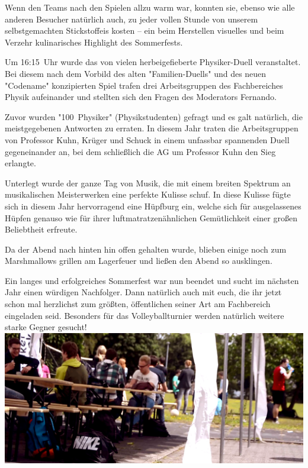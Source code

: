 \begin{multicols*}{2}
Wenn den Teams nach den Spielen allzu warm war, konnten sie, ebenso wie alle anderen Besucher natürlich auch, zu jeder vollen Stunde von unserem selbstgemachten Stickstoffeis kosten -- ein beim Herstellen visuelles und beim Verzehr kulinarisches Highlight des Sommerfests. 

Um 16:15~Uhr wurde das von vielen herbeigefieberte Physiker-Duell veranstaltet.
Bei diesem nach dem Vorbild des alten "Familien-Duells" und des neuen "Codename" konzipierten Spiel trafen drei Arbeitsgruppen des Fachbereiches Physik aufeinander und stellten sich den Fragen des Moderators Fernando.

Zuvor wurden "100~Physiker" (Physikstudenten) gefragt und es galt natürlich, die meistgegebenen Antworten zu erraten.
In diesem Jahr traten die Arbeitsgruppen von Professor Kuhn, Krüger und Schuck in einem unfassbar spannenden Duell gegeneinander an, bei dem schließlich die AG um Professor Kuhn den Sieg erlangte.

Unterlegt wurde der ganze Tag von Musik, die mit einem breiten Spektrum an musikalischen Meisterwerken eine perfekte Kulisse schuf. In diese Kulisse fügte sich in diesem Jahr hervorragend eine Hüpfburg ein, welche sich für ausgelassenes Hüpfen genauso wie für ihrer luftmatratzenähnlichen Gemütlichkeit einer großen Beliebtheit erfreute.

Da der Abend nach hinten hin offen gehalten wurde, blieben einige noch zum Marshmallows grillen am Lagerfeuer und ließen
den Abend so ausklingen.

Ein langes und erfolgreiches Sommerfest war nun beendet und sucht im nächsten Jahr einen würdigen Nachfolger.
Dann natürlich auch mit euch, die ihr jetzt schon mal herzlichst zum größten, öffentlichen seiner Art am Fachbereich eingeladen seid.
Besonders für das Volleyballturnier werden natürlich weitere starke Gegner gesucht!
\includegraphics[width=\columnwidth]{res/sommerfest_zelt_cropped}
\end{multicols*}
